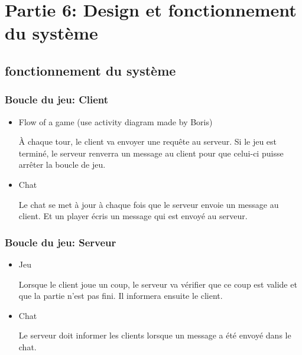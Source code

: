 \documentclass[utf8]{article}
\begin{document}
\section{Partie 6: Design et fonctionnement du système}
\subsection{fonctionnement du système}
\subsubsection{Boucle du jeu: Client}
\begin{itemize}
    \item Flow of a game (use activity diagram made by Boris)

        À chaque tour, le client va envoyer une requête au serveur. Si le jeu est terminé, le serveur renverra un message au client pour que
        celui-ci puisse arrêter la boucle de jeu.
    \item Chat

        Le chat se met à jour à chaque fois que le serveur envoie un message au client. Et un player écris un message qui est envoyé au serveur.
\end{itemize}
\subsubsection{Boucle du jeu: Serveur}
\begin{itemize}
    \item Jeu

        Lorsque le client joue un coup, le serveur va vérifier que ce coup est valide et que la partie n'est pas fini. Il informera ensuite
        le client.

    \item Chat
    
        Le serveur doit informer les clients lorsque un message a été envoyé dans le chat.


\end{itemize}
\end{document}

